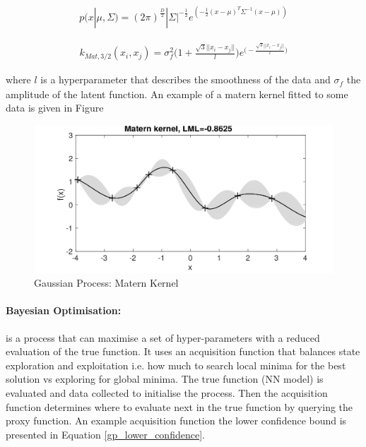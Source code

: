\documentclass[11pt,twoside]{report}
\begin{document}
\begin{equation}
\begin{aligned}
p(x|\mu,\Sigma) = (2 \pi)^{\frac{D}{2}} | \Sigma|^{- \frac{1}{2}} e^{(- \frac{1}{2}(x- \mu)^{T} \Sigma^{-1}(x- \mu))}
\end{aligned}
\label{gaus_dist}
\end{equation}


\begin{equation}
\begin{aligned}
k_{Mat,3/2}(x_{i},x_{j}) = 
\sigma_{f}^{2} \bigg ( 1 + 
\frac{\sqrt{3}||x_{i}-x_{j}||}{\mathit{l}} \bigg )e^{ \big (-\frac{\sqrt{3}||x_{i}-x_{j}||}{\mathit{l}} \big )}
\end{aligned}
\label{matern}
\end{equation}

where $\mathit{l}$ is a hyperparameter that describes the smoothness of the data and $\mathit{\sigma_{f}}$ the amplitude of the latent function. An example of a matern kernel fitted to some data is given in Figure 


\noindent \begin{figure}[h!]
	\includegraphics[width = 1.0\hsize]{./figures/Matern_Kernel.png}
	\caption{Gaussian Process: Matern Kernel \cite{Marc_Deisenroth_Notes}}
	\label{matern_kernel_fig}
\end{figure}

\paragraph{Bayesian Optimisation:}
is a process that can maximise a set of hyper-parameters with a reduced evaluation of the true function. It uses an acquisition function that balances state exploration and exploitation i.e. how much to search local minima for the best solution vs exploring for global minima. The true function (NN model) is evaluated and data collected to initialise the process. Then the acquisition function determines where to evaluate next in the true function by querying the proxy function. An example acquisition function the lower confidence bound \cite{SrinivasNiranjan2010GPOi} is presented in Equation \ref{gp_lower_confidence}.
\end{document}
